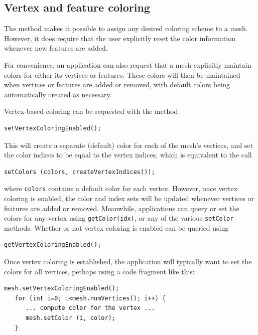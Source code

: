 \subsection{Vertex and feature coloring}
\label{vertexAndFeatureColoring:sec}

The method  makes
it possible to assign any desired coloring scheme to a mesh. However,
it does require that the user explicitly reset the color information
whenever new features are added.

For convenience, an application can also request that a mesh
explicitly maintain colors for either its vertices or features.  These
colors will then be maintained when vertices or features are added or
removed, with default colors being automatically created as necessary.

Vertex-based coloring can be requested with the method
%
\begin{lstlisting}[]
   setVertexColoringEnabled();
\end{lstlisting}
%
This will create a separate (default) color for each of the mesh's
vertices, and set the color indices to be equal to the vertex indices,
which is equivalent to the call
%
\begin{lstlisting}[]
   setColors (colors, createVertexIndices());
\end{lstlisting}
%
where {\tt colors} contains a default color for each
vertex. However, once vertex coloring is enabled, the color and index
sets will be updated whenever vertices or features are added or
removed. Meanwhile, applications can query or set the colors
for any vertex using {\tt getColor(idx)}, or any of the
various {\tt setColor} methods.
Whether or not vertex coloring
is enabled can be queried using
%
\begin{lstlisting}[]
   getVertexColoringEnabled();
\end{lstlisting}
%
Once vertex coloring is established, the application will typically
want to set the colors for all vertices, perhaps using a code fragment
like this:
%
\begin{lstlisting}[]
   mesh.setVertexColoringEnabled();
   for (int i=0; i<mesh.numVertices(); i++) {
      ... compute color for the vertex ...
      mesh.setColor (i, color);
   }
\end{lstlisting}
%

